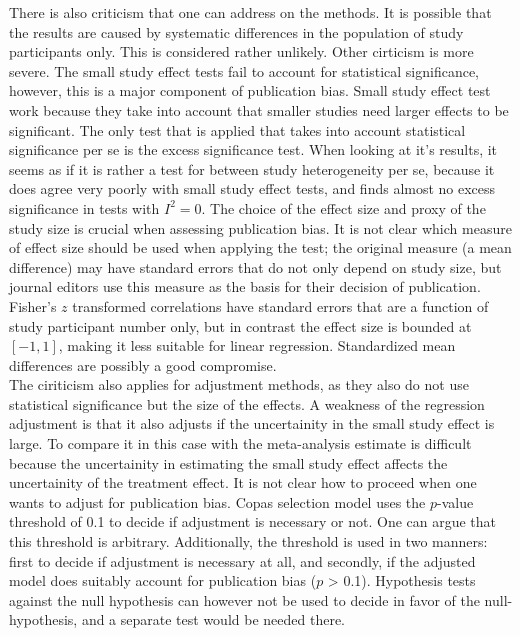 \documentclass[11pt,a4paper,twoside]{book}\usepackage[]{graphicx}\usepackage[]{color}
\begin{document}
There is also criticism that one can address on the methods. It is possible that the results are caused by systematic differences in the population of study participants only. This is considered rather unlikely. Other cirticism is more severe. The small study effect tests fail to account for statistical significance, however, this is a major component of publication bias. Small study effect test work because they take into account that smaller studies need larger effects to be significant. The only test that is applied that takes into account statistical significance per se is the excess significance test. When looking at it's results, it seems as if it is rather a test for between study heterogeneity per se, because it does agree very poorly with small study effect tests, and finds almost no excess significance in tests with $I^2 = 0$. The choice of the effect size and proxy of the study size is crucial when assessing publication bias. It is not clear which measure of effect size should be used when applying the test; the original measure (\eg a mean difference) may have standard errors that do not only depend on study size, but journal editors use this measure as the basis for their decision of publication. Fisher's $z$ transformed correlations have standard errors that are a function of study participant number only, but in contrast the effect size is bounded at$[-1,1]$, making it less suitable for linear regression. Standardized mean differences are possibly a good compromise.\\
The ciriticism also applies for adjustment methods, as they also do not use statistical significance but the size of the effects. A weakness of the regression adjustment is that it also adjusts if the uncertainity in the small study effect is large. To compare it in this case with the meta-analysis estimate is difficult because the uncertainity in estimating the small study effect affects the uncertainity of the treatment effect. It is not clear how to proceed when one wants to adjust for publication bias. Copas selection model uses the $p$-value threshold of 0.1 to decide if adjustment is necessary or not. One can argue that this threshold is arbitrary. Additionally, the threshold is used in two manners: first to decide if adjustment is necessary at all, and secondly, if the adjusted model does suitably account for publication bias ($p$ > 0.1). Hypothesis tests against the null hypothesis can however not be used to decide in favor of the null-hypothesis, and a separate test would be needed there. \\
\end{document}

